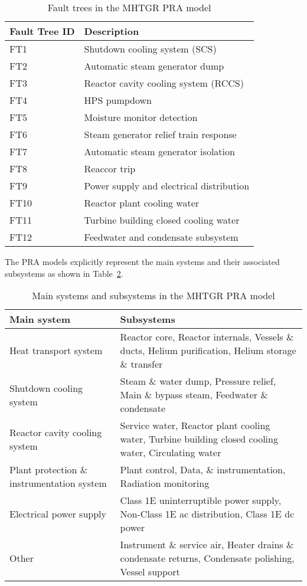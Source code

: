 \begin{table}[H]
    \centering
    \caption{Fault trees in the MHTGR PRA model}
    \label{tab:mhtgr-fault-trees}
    \begin{tabular}{ll}
        \toprule
        \textbf{Fault Tree ID} & \textbf{Description} \\
        \midrule
        FT1 & Shutdown cooling system (SCS) \\
        FT2 & Automatic steam generator dump \\
        FT3 & Reactor cavity cooling system (RCCS) \\
        FT4 & HPS pumpdown \\
        FT5 & Moisture monitor detection \\
        FT6 & Steam generator relief train response \\
        FT7 & Automatic steam generator isolation \\
        FT8 & Reaccor trip \\
        FT9 & Power supply and electrical distribution \\
        FT10 & Reactor plant cooling water \\
        FT11 & Turbine building closed cooling water \\
        FT12 & Feedwater and condensate subsystem \\
        \bottomrule
    \end{tabular}
\end{table}

The PRA models explicitly represent the main systems and their associated subsystems as shown in Table~\ref{tab:mhtgr-sscs}.

\renewcommand{\arraystretch}{1.5}
\begin{table}[H]
    \centering
    \caption{Main systems and subsystems in the MHTGR PRA model}
    \label{tab:mhtgr-sscs}
    \begin{tabular}{p{} p{}}
        \toprule
        \textbf{Main system} & \textbf{Subsystems} \\
        \midrule
        Heat transport system & Reactor core, Reactor internals, Vessels \& ducts, Helium purification, Helium storage \& transfer \\
        Shutdown cooling system & Steam \& water dump, Pressure relief, Main \& bypass steam, Feedwater \& condensate \\
        Reactor cavity cooling system & Service water, Reactor plant cooling water, Turbine building closed cooling water, Circulating water \\
        Plant protection \& instrumentation system & Plant control, Data, \& instrumentation, Radiation monitoring \\
        Electrical power supply & Class 1E uninterruptible power supply, Non-Class 1E ac distribution, Class 1E dc power \\
        Other & Instrument \& service air, Heater drains \& condensate returns, Condensate polishing, Vessel support \\
        \bottomrule
    \end{tabular}
\end{table}

